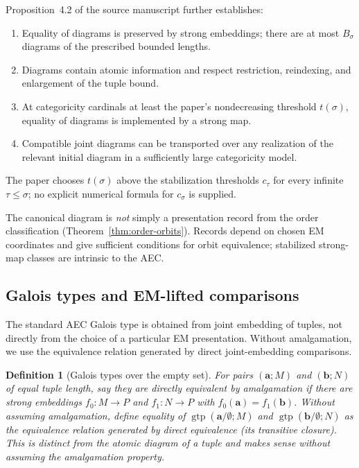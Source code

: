 \documentclass[11pt]{article}
\newcommand{\ba}{\mathbf{a}}
\newcommand{\bb}{\mathbf{b}}
\theoremstyle{plain}
\newtheorem{definition}{Definition}[section]
\begin{document}
Proposition~4.2 of the source manuscript further establishes:
\begin{enumerate}[label=(\arabic*)]
\item Equality of diagrams is preserved by strong embeddings; there are at most $B_\sigma$ diagrams of the prescribed bounded lengths.
\item Diagrams contain atomic information and respect restriction, reindexing, and enlargement of the tuple bound.
\item At categoricity cardinals at least the paper's nondecreasing threshold $t(\sigma)$, equality of diagrams is implemented by a strong map.
\item Compatible joint diagrams can be transported over any realization of the relevant initial diagram in a sufficiently large categoricity model.
\end{enumerate}
The paper chooses $t(\sigma)$ above the stabilization thresholds
$c_\tau$ for every infinite $\tau\leq\sigma$; no explicit numerical
formula for $c_\sigma$ is supplied.

The canonical diagram is \emph{not} simply a presentation record from the order classification (Theorem~\ref{thm:order-orbits}). Records depend on chosen EM coordinates and give sufficient conditions for orbit equivalence; stabilized strong-map classes are intrinsic to the AEC.


\subsection{Galois types and EM-lifted comparisons}\label{subsec:galois}
The standard AEC Galois type is obtained from joint
embedding of tuples, not directly from the choice
of a particular EM presentation. Without amalgamation,
we use the equivalence relation generated by direct
joint-embedding comparisons.

\begin{definition}[Galois types over the empty set]
For pairs $(\ba;M)$ and $(\bb;N)$ of equal tuple length, say
they are \emph{directly equivalent by amalgamation} if there are strong embeddings
$f_0:M\to P$ and $f_1:N\to P$ with $f_0(\ba)=f_1(\bb)$.
Without assuming amalgamation, define equality of
$\operatorname{gtp}(\ba/\emptyset;M)$ and
$\operatorname{gtp}(\bb/\emptyset;N)$ as the equivalence relation
generated by direct equivalence (its transitive closure).
This is distinct from the atomic diagram of a tuple and
makes sense without assuming the amalgamation property.
\end{definition}
\end{document}
